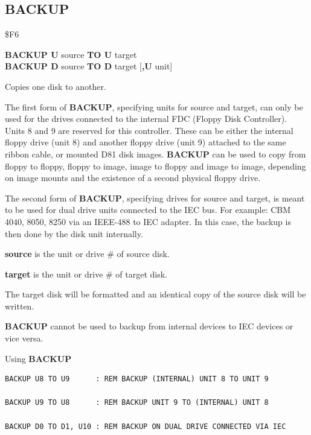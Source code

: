 \subsection{BACKUP}
\begin{description}[leftmargin=2cm,style=nextline]
\item [Token:]    \$F6

\item [Format:]   {\bf BACKUP U} source {\bf TO U} target \\
                  {\bf BACKUP D} source {\bf TO D} target [{\bf,U} unit]

\item [Usage:]    Copies one disk to another.

                  The first form of {\bf BACKUP}, specifying units for source and target, can only be used for the drives connected to the internal FDC (Floppy Disk Controller). Units 8 and 9 are reserved for this controller. These can be either the internal floppy drive (unit 8) and another floppy drive (unit 9) attached to the same ribbon cable, or mounted D81 disk images. {\bf BACKUP} can be used to copy from floppy to floppy, floppy to image, image to floppy and image to image, depending on image mounts and the existence of a second physical floppy drive.

                  The second form of {\bf BACKUP}, specifying drives for source and target, is meant to be used for dual drive units connected to the IEC bus. For example: CBM 4040, 8050, 8250 via an IEEE-488 to IEC adapter. In this case, the backup is then done by the disk unit internally.

                  {\bf source} is the unit or drive \# of source disk.

                  {\bf target} is the unit or drive \# of target disk.

\item [Remarks:]  The target disk will be formatted and an identical copy of the source disk will be written. 

                  {\bf BACKUP} cannot be used to backup from internal devices to IEC devices or vice versa.

\item [Examples:] Using {\bf BACKUP}

\begin{tcolorbox}[colback=black,coltext=white]
\verbatimfont{\codefont}
\begin{verbatim}
BACKUP U8 TO U9      : REM BACKUP (INTERNAL) UNIT 8 TO UNIT 9

BACKUP U9 TO U8      : REM BACKUP UNIT 9 TO (INTERNAL) UNIT 8

BACKUP D0 TO D1, U10 : REM BACKUP ON DUAL DRIVE CONNECTED VIA IEC
\end{verbatim}
\end{tcolorbox}
\end{description}

